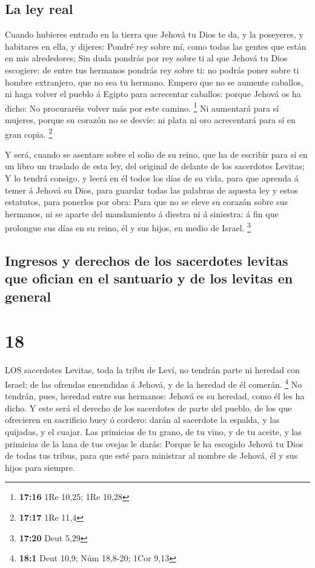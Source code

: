 \hypertarget{la-ley-real}{%
\subsection{La ley real}\label{la-ley-real}}

 Cuando hubieres entrado en la tierra que Jehová tu Dios te
da, y la poseyeres, y habitares en ella, y dijeres: Pondré rey sobre mí,
como todas las gentes que están en mis alrededores;  Sin
duda pondrás por rey sobre ti al que Jehová tu Dios escogiere: de entre
tus hermanos pondrás rey sobre ti: no podrás poner sobre ti hombre
extranjero, que no sea tu hermano.  Empero que no se
aumente caballos, ni haga volver el pueblo á Egipto para acrecentar
caballos: porque Jehová os ha dicho: No procuraréis volver más por este
camino. \footnote{\textbf{17:16} 1Re 10,25; 1Re 10,28}  Ni
aumentará para sí mujeres, porque su corazón no se desvíe: ni plata ni
oro acrecentará para sí en gran copia. \footnote{\textbf{17:17} 1Re 11,4}

 Y será, cuando se asentare sobre el solio de su reino, que
ha de escribir para sí en un libro un traslado de esta ley, del original
de delante de los sacerdotes Levitas;  Y lo tendrá consigo,
y leerá en él todos los días de su vida, para que aprenda á temer á
Jehová su Dios, para guardar todas las palabras de aquesta ley y estos
estatutos, para ponerlos por obra:  Para que no se eleve su
corazón sobre sus hermanos, ni se aparte del mandamiento á diestra ni á
siniestra: á fin que prolongue sus días en su reino, él y sus hijos, en
medio de Israel. \footnote{\textbf{17:20} Deut 5,29}

\hypertarget{ingresos-y-derechos-de-los-sacerdotes-levitas-que-ofician-en-el-santuario-y-de-los-levitas-en-general}{%
\subsection{Ingresos y derechos de los sacerdotes levitas que ofician en
el santuario y de los levitas en
general}\label{ingresos-y-derechos-de-los-sacerdotes-levitas-que-ofician-en-el-santuario-y-de-los-levitas-en-general}}

\hypertarget{section-17}{%
\section{18}\label{section-17}}

 LOS sacerdotes Levitas, toda la tribu de Leví, no tendrán
parte ni heredad con Israel; de las ofrendas encendidas á Jehová, y de
la heredad de él comerán. \footnote{\textbf{18:1} Deut 10,9; Núm
  18,8-20; 1Cor 9,13}  No tendrán, pues, heredad entre sus
hermanos: Jehová es su heredad, como él les ha dicho.  Y
este será el derecho de los sacerdotes de parte del pueblo, de los que
ofrecieren en sacrificio buey ó cordero: darán al sacerdote la espalda,
y las quijadas, y el cuajar.  Las primicias de tu grano, de
tu vino, y de tu aceite, y las primicias de la lana de tus ovejas le
darás:  Porque le ha escogido Jehová tu Dios de todas tus
tribus, para que esté para ministrar al nombre de Jehová, él y sus hijos
para siempre.

